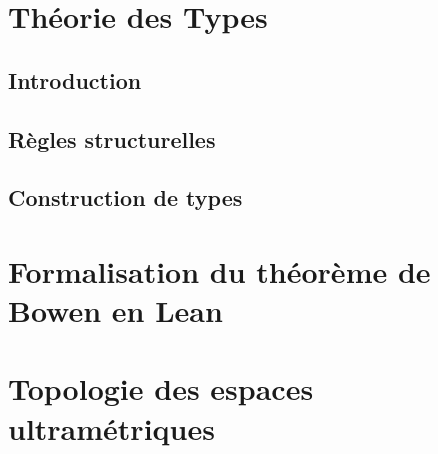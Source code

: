 \documentclass[a4paper, 11pt]{article}
\title{\Title}
\author{\Author}
\date{\today}
\begin{document}
  \maketitle
  \tableofcontents
  \pagebreak

  \section{Théorie des Types}
    \subsection{Introduction}
      


    \subsection{Règles structurelles}
      

    \subsection{Construction de types}
      

  \newpage
  \section{Formalisation du théorème de Bowen en Lean}
    

  \newpage
  \section{Topologie des espaces ultramétriques}
    

\end{document}
